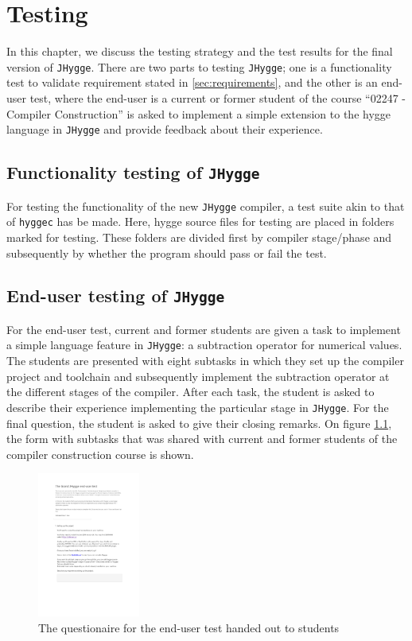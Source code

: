 \chapter{Testing}\label{sec:testing}

In this chapter, we discuss the testing strategy and the test results for the final version of \texttt{JHygge}.
There are two parts to testing \texttt{JHygge}; one is a functionality test to validate requirement stated in \ref{sec:requirements},
and the other is an end-user test, where the end-user is a current or former student of the course ``02247 - Compiler Construction''
is asked to implement a simple extension to the hygge language in \texttt{JHygge} and provide feedback about their experience.

\section{Functionality testing of \texttt{JHygge}}

For testing the functionality of the new \texttt{JHygge} compiler, a test suite akin to that of \texttt{hyggec} has be made.
Here, hygge source files for testing are placed in folders marked for testing. These folders are divided first by compiler
stage/phase and subsequently by whether the program should pass or fail the test.

\section{End-user testing of \texttt{JHygge}}

For the end-user test, current and former students are given a task to implement a simple language feature in \texttt{JHygge}:
a subtraction operator for numerical values. The students are presented with eight subtasks in which they set up the compiler
project and toolchain and subsequently implement the subtraction operator at the different stages of the compiler. After
each task, the student is asked to describe their experience implementing the particular stage in \texttt{JHygge}. For the
final question, the student is asked to give their closing remarks. On figure \ref{fig:end_user_test}, the form with subtasks
that was shared with current and former students of the compiler construction course is shown.

\begin{figure}[H]
\centering
\includegraphics[width=0.3\textwidth]{Pictures/the_grand_jhygge_end_user_test.pdf}
\caption{The questionaire for the end-user test handed out to students}
\label{fig:end_user_test}
\end{figure}
